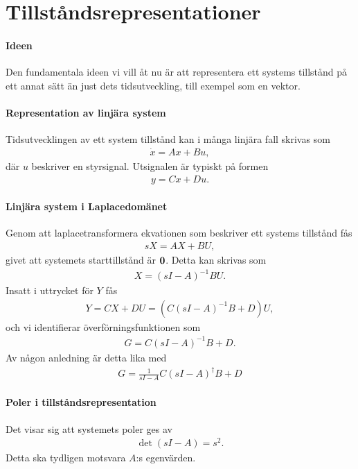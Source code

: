 \section{Tillståndsrepresentationer}

\paragraph{Ideen}
Den fundamentala ideen vi vill åt nu är att representera ett systems tillstånd på ett annat sätt än just dets tidsutveckling, till exempel som en vektor.

\paragraph{Representation av linjära system}
Tidsutvecklingen av ett system tillstånd kan i många linjära fall skrivas som
\begin{align*}
	\dot{x} = Ax + Bu,
\end{align*}
där $u$ beskriver en styrsignal. Utsignalen är typiskt på formen
\begin{align*}
	y = Cx + Du.
\end{align*}

\paragraph{Linjära system i Laplacedomänet}
Genom att laplacetransformera ekvationen som beskriver ett systems tillstånd fås
\begin{align*}
	sX = AX + BU,
\end{align*}
givet att systemets starttillstånd är $\vb{0}$. Detta kan skrivas som
\begin{align*}
	X = (sI - A)^{-1}BU.
\end{align*}
Insatt i uttrycket för $Y$ fås
\begin{align*}
	Y = CX + DU = (C(sI - A)^{-1}B + D)U,
\end{align*}
och vi identifierar överförningsfunktionen som
\begin{align*}
	G = C(sI - A)^{-1}B + D.
\end{align*}
Av någon anledning är detta lika med
\begin{align*}
	G = \frac{1}{sI - A}C(sI - A)^{\dagger}B + D
\end{align*}

\paragraph{Poler i tillståndsrepresentation}
Det visar sig att systemets poler ges av
\begin{align*}
	\det(sI - A) = s^{2}.
\end{align*}
Detta ska tydligen motsvara $A$:s egenvärden.

